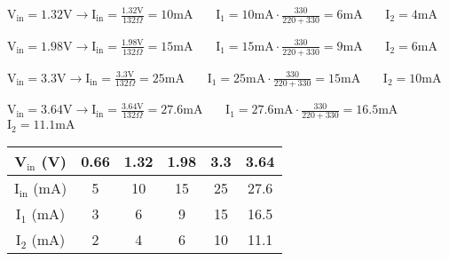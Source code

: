 \documentclass{article}
\begin{document}
\vspace{4mm}

{V$\displaystyle _\text{in} = 1.32\text{V} \rightarrow  \text{I}_\text{in} = \frac{1.32\text{V}}{132\Omega} = 10\text{mA} $} \ \ \ {$\displaystyle \text{I}_\text{1} =  10\text{mA} \cdot\frac{\text{330}}{220 + 330} = 6\text{mA} $} \ \ \ {$\displaystyle \text{I}_\text{2} = 4\text{mA} $}

\vspace{4mm}

{V$\displaystyle _\text{in} = 1.98\text{V} \rightarrow  \text{I}_\text{in} = \frac{1.98\text{V}}{132\Omega} = 15\text{mA} $} \ \ \ {$\displaystyle \text{I}_\text{1} =  15\text{mA} \cdot\frac{\text{330}}{220 + 330} = 9\text{mA} $} \ \ \ {$\displaystyle \text{I}_\text{2} = 6\text{mA} $}

\vspace{4mm}

{V$\displaystyle _\text{in} = 3.3\text{V} \rightarrow  \text{I}_\text{in} = \frac{3.3\text{V}}{132\Omega} = 25\text{mA} $} \ \ \ {$\displaystyle \text{I}_\text{1} = 25\text{mA} \cdot\frac{\text{330}}{220 + 330} = 15\text{mA} $} \ \ \ {$\displaystyle \text{I}_\text{2} = 10\text{mA} $}

\vspace{4mm}

{V$\displaystyle _\text{in} = 3.64\text{V} \rightarrow  \text{I}_\text{in} = \frac{3.64\text{V}}{132\Omega} = 27.6\text{mA} $} \ \ \ {$\displaystyle \text{I}_\text{1} =  27.6\text{mA} \cdot\frac{\text{330}}{220 + 330} = 16.5\text{mA} $} \ \ \ {$\displaystyle \text{I}_\text{2} = 11.1\text{mA} $}

\vspace{4mm}

\begin{center}
    \large
    \begin{tabular}{ |c| c c c c c | } 
    \hline
        V$_\text{in}$ (V) & 0.66 & 1.32 & 1.98 & 3.3 & 3.64\\
        \hline
        I$_\text{in}$ (mA) & 5 & 10 & 15 & 25 & 27.6 \\
        \hline
        I$_\text{1}$ (mA) & 3 & 6 & 9 & 15 & 16.5 \\
        \hline
        I$_\text{2}$ (mA) & 2 & 4 & 6 & 10 & 11.1 \\
        \hline
    \end{tabular}
\end{center}

\vspace{4mm}
\end{document}
